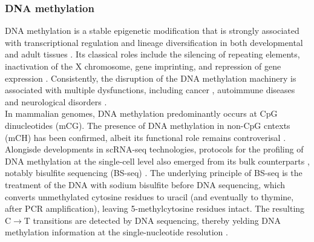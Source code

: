 \subsubsection{DNA methylation}
DNA methylation is a stable epigenetic modification that is strongly associated with transcriptional regulation and lineage diversification in both developmental and adult tissues \cite{Jin2018, Harrison2011, Lee2014, Smith2013, Jones2012}. Its classical roles include the silencing of repeating elements, inactivation of the X chromosome, gene imprinting, and repression of gene expression \cite{??}. Consistently, the disruption of the DNA methylation machinery is associated with multiple dysfunctions, including cancer \cite{Baylin2011}, autoimmune diseases \cite{Liu2013} and neurological disorders \cite{Amir1999}.\\
In mammalian genomes, DNA methylation predominantly occurs at CpG dinucleotides (mCG). The presence of DNA methylation in non-CpG cntexts (mCH) has been confirmed, albeit its functional role remains controverisal \cite{He2015, Ramsahoye2000, Lister2009}.\\

Alongisde developments in scRNA-seq technologies, protocols for the profiling of DNA methylation at the single-cell level also emerged from its bulk counterparts , notably bisulfite sequencing (BS-seq) \cite{Smallwood2014,Guo2013,Gravina2016,Farlik2015}. The underlying principle of BS-seq is the treatment of the DNA with sodium bisulfite before DNA sequencing, which converts unmethylated cytosine residues to uracil (and eventually to thymine, after PCR amplification), leaving 5-methylcytosine residues intact. The resulting C$\to$T transitions are detected by DNA sequencing, thereby yelding DNA methylation information at the single-nucleotide resolution \cite{Frommer1992,Clark2016,Clark2017}.\\

